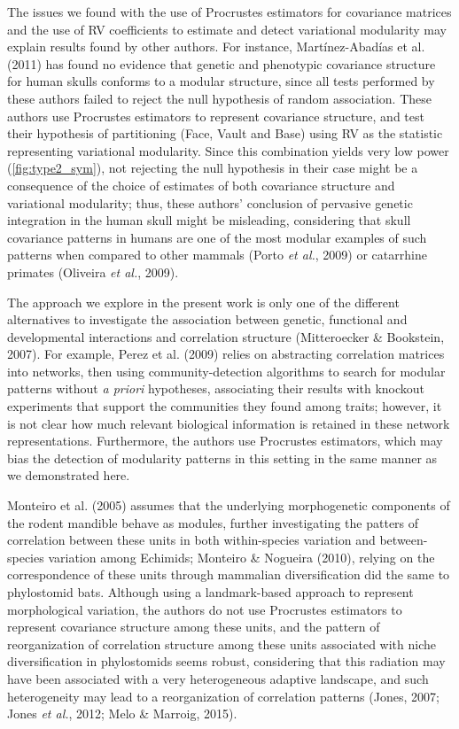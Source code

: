 \documentclass[12pt,twoside]{report}
\begin{document}
The issues we found with the use of Procrustes estimators for covariance
matrices and the use of RV coefficients to estimate and detect
variational modularity may explain results found by other authors. For
instance, Martínez-Abadías et al. (2011) has found no evidence that
genetic and phenotypic covariance structure for human skulls conforms to
a modular structure, since all tests performed by these authors failed
to reject the null hypothesis of random association. These authors use
Procrustes estimators to represent covariance structure, and test their
hypothesis of partitioning (Face, Vault and Base) using RV as the
statistic representing variational modularity. Since this combination
yields very low power (\autoref{fig:type2_sym}), not rejecting the null
hypothesis in their case might be a consequence of the choice of
estimates of both covariance structure and variational modularity; thus,
these authors' conclusion of pervasive genetic integration in the human
skull might be misleading, considering that skull covariance patterns in
humans are one of the most modular examples of such patterns when
compared to other mammals (Porto \emph{et al.}, 2009) or catarrhine
primates (Oliveira \emph{et al.}, 2009).

The approach we explore in the present work is only one of the different
alternatives to investigate the association between genetic, functional
and developmental interactions and correlation structure (Mitteroecker
\& Bookstein, 2007). For example, Perez et al. (2009) relies on
abstracting correlation matrices into networks, then using
community-detection algorithms to search for modular patterns without
\emph{a priori} hypotheses, associating their results with knockout
experiments that support the communities they found among traits;
however, it is not clear how much relevant biological information is
retained in these network representations. Furthermore, the authors use
Procrustes estimators, which may bias the detection of modularity
patterns in this setting in the same manner as we demonstrated here.

Monteiro et al. (2005) assumes that the underlying morphogenetic
components of the rodent mandible behave as modules, further
investigating the patters of correlation between these units in both
within-species variation and between-species variation among Echimids;
Monteiro \& Nogueira (2010), relying on the correspondence of these
units through mammalian diversification did the same to phylostomid
bats. Although using a landmark-based approach to represent
morphological variation, the authors do not use Procrustes estimators to
represent covariance structure among these units, and the pattern of
reorganization of correlation structure among these units associated
with niche diversification in phylostomids seems robust, considering
that this radiation may have been associated with a very heterogeneous
adaptive landscape, and such heterogeneity may lead to a reorganization
of correlation patterns (Jones, 2007; Jones \emph{et al.}, 2012; Melo \&
Marroig, 2015).
\end{document}
